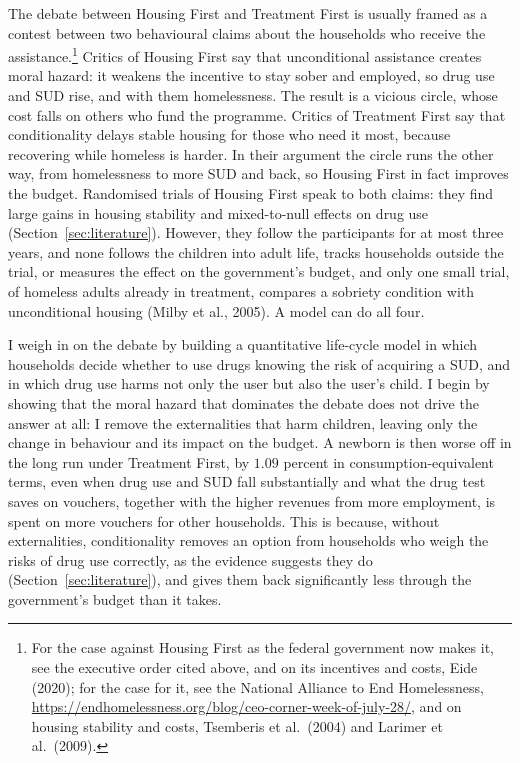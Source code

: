 \documentclass[10pt]{article}
\begin{document}
The debate between Housing First and Treatment First is usually framed as a contest between two behavioural claims about the households who receive the assistance.\footnote{For the case
against Housing First as the federal government now makes it, see the executive order
cited above, and on its incentives and costs, Eide (2020); for the case for it, see the National Alliance to End Homelessness,
\url{https://endhomelessness.org/blog/ceo-corner-week-of-july-28/}, and on housing stability and costs, Tsemberis et al.\ (2004) and Larimer et al.\ (2009).} Critics of Housing First say that unconditional assistance creates moral hazard: it weakens the incentive to stay sober and employed, so drug use and SUD rise, and with them homelessness. The result is a vicious circle, whose cost falls on others who fund the programme. Critics of Treatment First say that conditionality delays stable housing for those who need it most, because recovering while homeless is harder. In their argument the circle runs the other way, from homelessness to more SUD and back, so Housing First in fact improves the budget. Randomised trials of Housing First speak to both claims: they find large gains in housing stability and mixed-to-null effects on drug use (Section~\ref{sec:literature}). However, they follow the participants for at most three years, and none follows the children into adult life, tracks households outside the trial, or measures the effect on the government's budget, and only one small trial, of homeless adults already in treatment, compares a sobriety condition with unconditional housing (Milby et al., 2005). A model can do all four.

I weigh in on the debate by building a quantitative life-cycle model in which households decide whether to use drugs knowing the risk of acquiring a SUD, and in which drug use harms not only the user but also the user's child. I begin by showing that the moral hazard that dominates the debate does not drive the answer at all: I remove the externalities that harm children, leaving only the change in behaviour and its impact on the budget. A newborn is then worse off in the long run under Treatment First, by $1.09$ percent in consumption-equivalent terms, even when drug use and SUD fall substantially and what the drug test saves on vouchers, together with the higher revenues from more employment, is spent on more vouchers for other households. This is because, without externalities, conditionality removes an option from households who weigh the risks of drug use correctly, as the evidence suggests they do (Section~\ref{sec:literature}), and gives them back significantly less through the government's budget than it takes.
\end{document}
